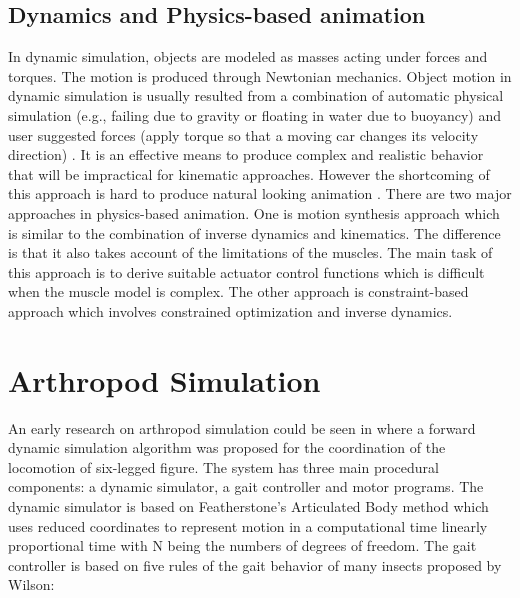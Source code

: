 \subsection{Dynamics and Physics-based animation}
In dynamic simulation, objects are modeled as masses acting under
forces and torques. The motion is produced through Newtonian
mechanics. Object motion in dynamic simulation is usually resulted
from a combination of automatic physical simulation (e.g., failing due
to gravity or floating in water due to buoyancy) and user suggested
forces (apply torque so that a moving car changes its velocity
direction) \cite{dy1}. It is an effective means to produce complex and
realistic behavior that will be impractical for kinematic
approaches. However the shortcoming of this approach is hard to
produce natural looking animation \cite{dy2}. 
There are two major approaches in physics-based animation. One is
motion synthesis approach which is similar to the combination of
inverse dynamics and kinematics. The difference is that it also takes
account of the limitations of the muscles. The main task of this
approach is to derive suitable actuator control functions which is
difficult when the muscle model is complex. The other approach is
constraint-based approach which involves constrained optimization and
inverse dynamics. 


\section{Arthropod Simulation} %
\label{sec:arthropod_simulation}

An early research on arthropod simulation could be seen in \cite{arsimu1} where a
forward dynamic simulation algorithm was proposed for the coordination
of the locomotion of six-legged figure. The system has three main
procedural components: a dynamic simulator, a gait controller and
motor programs. The dynamic simulator is based on Featherstone's
Articulated Body method which uses reduced coordinates to represent
motion in a computational time linearly proportional time with N being
the numbers of degrees of freedom. The gait controller is based on five rules of
the gait behavior of many insects proposed by Wilson\cite{arsimu2}: 

